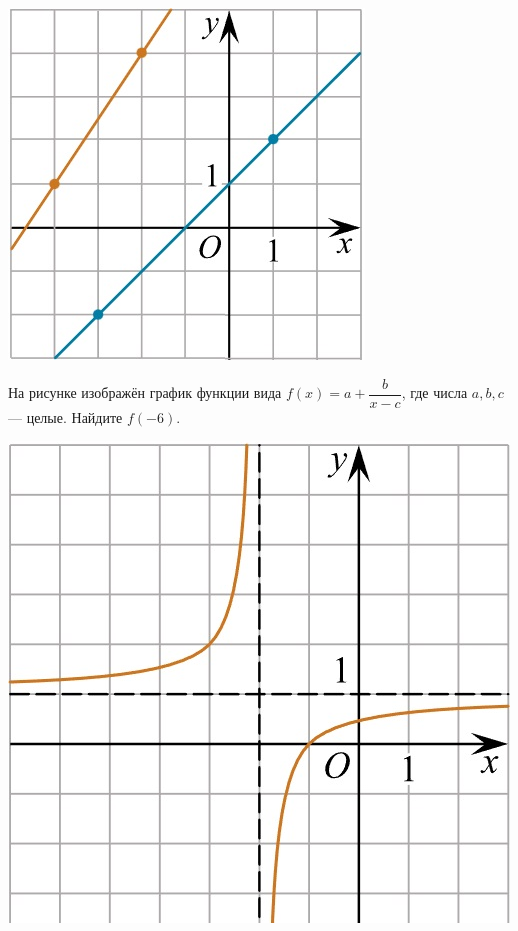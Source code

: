 \begin{homework}[number=2]
\begin{listofex}
\begin{minipage}[c]{0.1\textwidth}
			\includegraphics[align=t, width=\textwidth]{pics/G102M4H2-2.jpg}
		\end{minipage}
		\item
		\begin{minipage}[t]{0.43\textwidth}
			На рисунке изображён график функции вида \(f(x)=a+\dfrac{b}{x-c}\), где числа \(a, b, c\) --- целые. Найдите \(f(-6)\).
		\end{minipage}
		\begin{minipage}[c]{0.1\textwidth}
			\includegraphics[align=t, width=\textwidth]{pics/G101M4H2-10.jpg}

\end{minipage}
\end{listofex}
\end{homework}
